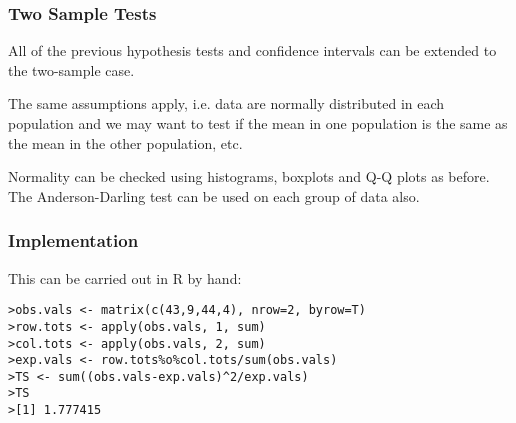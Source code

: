 \documentclass[a4paper,12pt]{article}
\begin{document}



\subsubsection{Two Sample Tests}


All of the previous hypothesis tests and confidence intervals can be
extended to the two-sample case.

The same assumptions apply, i.e. data are normally distributed in
each population and we may want to test if the mean in one
population is the same as the mean in the other population, etc.

Normality can be checked using histograms, boxplots and Q-Q
plots as before. The Anderson-Darling test can be used on
each group of data also.


\subsubsection{Implementation}

This can be carried out in R by hand:

\footnotesize \begin{verbatim}
>obs.vals <- matrix(c(43,9,44,4), nrow=2, byrow=T)
>row.tots <- apply(obs.vals, 1, sum)
>col.tots <- apply(obs.vals, 2, sum)
>exp.vals <- row.tots%o%col.tots/sum(obs.vals)
>TS <- sum((obs.vals-exp.vals)^2/exp.vals)
>TS
>[1] 1.777415
\end{verbatim}\normalsize
\end{document}
